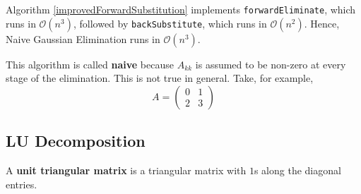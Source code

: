 \begin{rmk}
	Algorithm \ref{improvedForwardSubstitution} implements \texttt{forwardEliminate}, which runs in $\mathcal{O}(n^3)$, followed by \texttt{backSubstitute}, which runs in $\mathcal{O}(n^2)$. Hence, Naive Gaussian Elimination runs in $\mathcal{O}(n^3)$.
\end{rmk}

\begin{marginfigure}
	This algorithm is called \textbf{naive} because $A_{kk}$ is assumed to be non-zero at every stage of the elimination. This is not true in general. Take, for example,
	\[A=\left(\begin{array}{ll}
	0 & 1 \\
	2 & 3
	\end{array}\right)\]
\end{marginfigure}

\subsection{LU Decomposition}
\begin{defn}
	\sloppy A \textbf{unit triangular matrix} is a triangular matrix with $1$s along the diagonal entries.
\end{defn}

